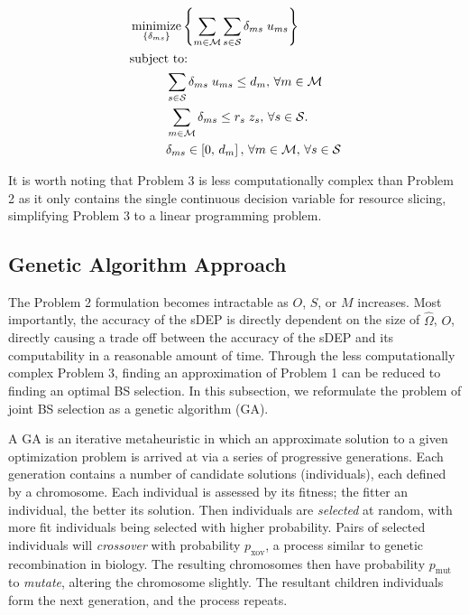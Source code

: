 \documentclass[conference]{IEEEtran}
\DeclareMathOperator*{\argmin}{minimize}
\begin{document}
\begin{tcolorbox}[floatplacement = !ht, float, title = Problem 3: Adaptive Slicing Model]
\begin{align}
& \argmin_{\left\{ \delta_{ms} \right\}} \left\{ \sum_{m \in \mathcal{M}} \sum_{s \in \mathcal{S}} \delta_{ms} \; u_{ms} \right\} \label{eq:ASMO}\\
& \text{subject to:}  \nonumber \\
& \hspace{0.4in} \sum_{s \in \mathcal{S}} \delta_{ms} \; u_{ms} \leq d_m,\, \forall m \in \mathcal{M} \label{eq:ASMC1}\\
& \hspace{0.4in} \sum_{m \in \mathcal{M}} \delta_{ms} \leq r_s \; z_s,\, \forall s \in \mathcal{S}. \label{eq:ASMC2}\\
& \hspace{0.4in} \delta_{ms} \in \left[ 0,\, d_m \right],\, \forall m \in \mathcal{M},\, \forall s \in \mathcal{S} \label{eq:ASMC3}
\end{align}
\end{tcolorbox}

It is worth noting that Problem 3 is less computationally complex than Problem 2 as it only contains the single continuous decision variable for resource slicing, simplifying Problem 3 to a linear programming problem.

\subsection{Genetic Algorithm Approach} \label{subsec:ga}

The Problem 2 formulation becomes intractable as $O$, $S$, or $M$ increases.  Most importantly, the accuracy of the sDEP is directly dependent on the size of $\hat{\Omega}$, $O$, directly causing a trade off between the accuracy of the sDEP and its computability in a reasonable amount of time.  Through the less computationally complex Problem 3, finding an approximation of Problem 1 can be reduced to finding an optimal BS selection.  In this subsection, we reformulate the problem of joint BS selection as a genetic algorithm (GA).

A GA is an iterative metaheuristic in which an approximate solution to a given optimization problem is arrived at via a series of progressive generations.  Each generation contains a number of candidate solutions (individuals), each defined by a chromosome.  Each individual is assessed by its fitness; the fitter an individual, the better its solution.  Then individuals are \emph{selected} at random, with more fit individuals being selected with higher probability.  Pairs of selected individuals will \emph{crossover} with probability $p_\text{xov}$, a process similar to genetic recombination in biology.  The resulting chromosomes then have probability $p_\text{mut}$ to \emph{mutate}, altering the chromosome slightly.  The resultant children individuals form the next generation, and the process repeats.
\end{document}
